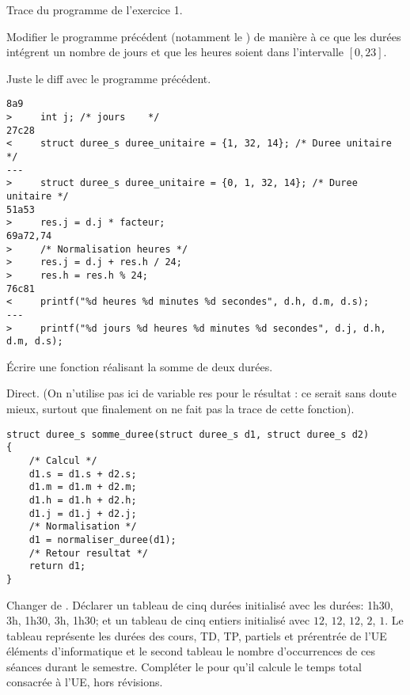 \begin{newenu}
\begin{correction}
\begin{sidewaystable}[h]
        \caption{Trace du programme de l'exercice 1.}
        \label{simulation}
    \end{sidewaystable}                 

  \end{correction}


  \item Modifier le programme précédent (notamment le ) de manière à ce que les durées intégrent un nombre de
    jours et que les heures soient dans l'intervalle $[0, 23]$.

    \begin{correction}
Juste le diff avec le programme précédent.

{
\footnotesize
\begin{verbatim}
8a9
>     int j; /* jours    */
27c28
<     struct duree_s duree_unitaire = {1, 32, 14}; /* Duree unitaire */
---
>     struct duree_s duree_unitaire = {0, 1, 32, 14}; /* Duree unitaire */
51a53
>     res.j = d.j * facteur;
69a72,74
>     /* Normalisation heures */
>     res.j = d.j + res.h / 24;
>     res.h = res.h % 24;
76c81
<     printf("%d heures %d minutes %d secondes", d.h, d.m, d.s);
---
>     printf("%d jours %d heures %d minutes %d secondes", d.j, d.h, d.m, d.s);
\end{verbatim}
}
    

\end{correction}

\item Écrire une fonction réalisant la somme de deux durées. 
  \begin{correction}
    Direct. (On n'utilise pas ici de variable res pour le résultat :
    ce serait sans doute mieux, surtout que finalement on ne fait pas
    la trace de cette fonction).
\begin{verbatim}
struct duree_s somme_duree(struct duree_s d1, struct duree_s d2)
{
    /* Calcul */
    d1.s = d1.s + d2.s;
    d1.m = d1.m + d2.m;
    d1.h = d1.h + d2.h;
    d1.j = d1.j + d2.j;
    /* Normalisation */
    d1 = normaliser_duree(d1);
    /* Retour resultat */
    return d1;
}
\end{verbatim}
  \end{correction}
\item Changer de . Déclarer un tableau  de cinq
  durées initialisé avec les durées: 1h30, 3h, 1h30, 3h, 1h30; et un
  tableau  de cinq entiers initialisé avec $12$,
  $12$, $12$, $2$, $1$. Le tableau  représente les durées
  des cours, TD, TP, partiels et prérentrée de l'UE éléments
  d'informatique et le second tableau le nombre d'occurrences de ces
  séances durant le semestre. Compléter le  pour qu'il
  calcule le temps total consacrée à l'UE,
  hors révisions.


\end{newenu}
